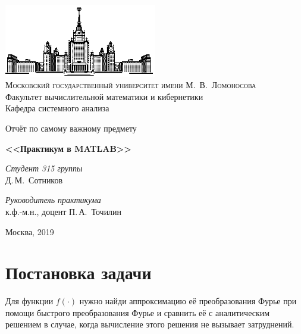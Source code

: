 \documentclass[11pt]{article}
\begin{document}
\thispagestyle{empty}

\begin{center}
\ \vspace{-3cm}

\includegraphics[width=0.5\textwidth]{msu.eps}\\
{\scshape Московский государственный университет имени М.~В.~Ломоносова}\\
Факультет вычислительной математики и кибернетики\\
Кафедра системного анализа

\vfill

{\LARGE Отчёт по самому важному предмету}

\vspace{1cm}

{\Huge\bfseries <<Практикум в MATLAB>>}
\end{center}

\vspace{1cm}

\begin{flushright}
  \large
  \textit{Студент 315 группы}\\
  Д.\,М.~Сотников

  \vspace{5mm}

  \textit{Руководитель практикума}\\
  к.ф.-м.н., доцент П.\,А.~Точилин
\end{flushright}

\vfill

\begin{center}
Москва, 2019
\end{center}


\newpage

\section{Постановка задачи}

Для функции $f\left(\cdot\right)$ нужно найди аппроксимацию её преобразования Фурье 
при помощи быстрого преобразования Фурье и сравнить её с аналитическим решением в случае, когда
вычисление этого решения не вызывает затруднений.
\end{document}
